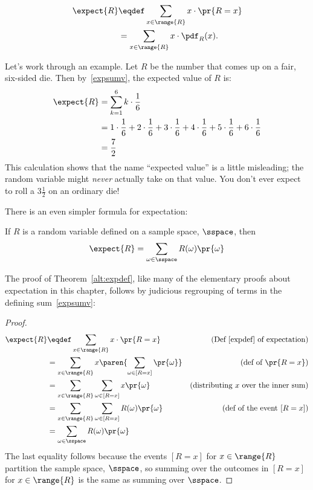 \begin{definition}\label{expdef}
\begin{align}
\expect{R} &\eqdef \sum_{x \in \range{R}} x \cdot \pr{R = x}\label{expsumv}\\
           & = \sum_{x \in \range{R}} x \cdot \pdf_R(x).\notag
\end{align}
\end{definition}

Let's work through an example.  Let $R$ be the number that comes up on a
fair, six-sided die.  Then by~\eqref{expsumv}, the expected value of $R$
is:
%
\begin{align*}
\expect{R}
    & = \sum_{k=1}^6 k \cdot \frac{1}{6} \\
    & = 1 \cdot \frac{1}{6} + 2 \cdot \frac{1}{6} + 3 \cdot \frac{1}{6} +
        4 \cdot \frac{1}{6} + 5 \cdot \frac{1}{6} + 6 \cdot \frac{1}{6} \\
    & = \frac{7}{2}
\end{align*}
%
This calculation shows that the name ``expected value'' is a little
misleading; the random variable might \textit{never} actually take on that
value.  You don't ever expect to roll a $3 \frac{1}{2}$ on an ordinary
die!

There is an even simpler formula for expectation:
\begin{theorem}\label{alt:expdef}
If $R$ is a random variable defined on a sample space, $\sspace$, then
\begin{equation}\label{expsumssp}
\expect{R} = \sum_{\omega \in \sspace} R(\omega) \pr{\omega}
\end{equation}
\end{theorem}
The proof of Theorem~\ref{alt:expdef}, like many of the elementary proofs
about expectation in this chapter, follows by judicious regrouping of terms
in the defining sum~\eqref{expsumv}:
\begin{proof}
\begin{align*}
\expect{R}
    & \eqdef \sum_{x \in \range{R}} x \cdot \pr{R = x} 
                           &\text{(Def~\ref{expdef} of expectation)}\\
    & = \sum_{x \in \range{R}} x \paren{\sum_{\omega \in [R=x]} \pr{\omega}}
              & \text{(def of $\pr{R=x}$)}\\
    & = \sum_{x \in \range{R}} \sum_{\omega \in [R=x]} x \pr{\omega}
             & \text{(distributing $x$ over the inner sum)} \\    
    & = \sum_{x \in \range{R}} \sum_{\omega \in [R=x]} R(\omega) \pr{\omega} 
                &\text{(def of the event $[R=x]$)}\\
    & = \sum_{\omega \in \sspace} R(\omega) \pr{\omega}
\end{align*}
The last equality follows because the events $[R=x]$ for $x \in \range{R}$
partition the sample space, $\sspace$, so summing over the outcomes in
$[R=x]$ for $x \in \range{R}$ is the same as summing over $\sspace$.
\end{proof}

